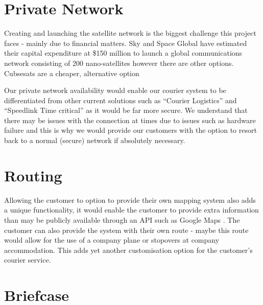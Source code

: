 


\section{Private Network}

Creating and launching the satellite network is the biggest challenge this project faces - mainly due to financial matters. Sky and Space Global have estimated their capital expenditure at \$150 million to launch a global communications network consisting of 200 nano-satellites however there are other options. Cubsesats \cite{cubsesat} are a cheaper, alternative option 

Our private network availability would enable our courier system to be differentiated from other current solutions such as “Courier Logistics” and “Speedlink Time critical” as it would be far more secure. We understand that there may be issues with the connection at times due to issues such as hardware failure and this is why we would provide our customers with the option to resort back to a normal (secure) network if absolutely necessary. 

\section{Routing}

Allowing the customer to option to provide their own mapping system also adds a unique functionality, it would enable the customer to provide extra information than may be publicly available through an API such as Google Maps \cite{GoogleMaps}. The customer can also provide the system with their own route - maybe this route would allow for the use of a company plane  or stopovers at company accommodation. This adds yet another customisation option for the customer's courier service.

\section{Briefcase} \label{briefcasemarket}

